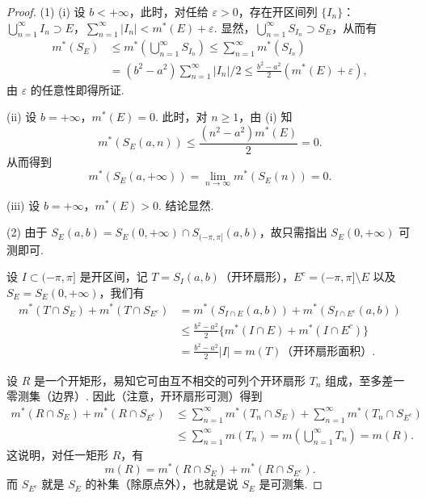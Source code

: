 \documentclass[../../main.tex]{subfiles}
\begin{document}
\begin{proof}
(1) (i) 设 \(b < +\infty\)，此时，对任给 \(\varepsilon > 0\)，存在开区间列 \(\{I_n\}\)：\(\bigcup_{n = 1}^{\infty} I_n \supset E\)，\(\sum_{n = 1}^{\infty}|I_n| < m^*(E) + \varepsilon\). 显然，\(\bigcup_{n = 1}^{\infty} S_{I_n} \supset S_E\)，从而有
\begin{align*}
m^*(S_E) &\leqslant m^*\left(\bigcup_{n = 1}^{\infty} S_{I_n}\right) \leqslant \sum_{n = 1}^{\infty}m^*(S_{I_n})\\
&= (b^2 - a^2)\sum_{n = 1}^{\infty}|I_n|/2 \leqslant \frac{b^2 - a^2}{2}(m^*(E) + \varepsilon),
\end{align*}
由 \(\varepsilon\) 的任意性即得所证.

(ii) 设 \(b = +\infty\)，\(m^*(E) = 0\). 此时，对 \(n \geqslant 1\)，由 (i) 知
\[
m^*(S_E(a,n)) \leqslant \frac{(n^2 - a^2)m^*(E)}{2} = 0.
\]
从而得到
\[
m^*(S_E(a, +\infty)) = \lim_{n \to \infty}m^*(S_E(n)) = 0.
\]

(iii) 设 \(b = +\infty\)，\(m^*(E) > 0\). 结论显然.

(2) 由于 \(S_E(a,b) = S_E(0, +\infty) \cap S_{(-\pi, \pi]}(a,b)\)，故只需指出 \(S_E(0, +\infty)\) 可测即可.

设 \(I \subset (-\pi, \pi]\) 是开区间，记 \(T = S_I(a,b)\)（开环扇形），\(E^c = (-\pi, \pi] \setminus E\) 以及 \(S_E = S_E(0, +\infty)\)，我们有
\begin{align*}
m^*(T \cap S_E) + m^*(T \cap S_{E^c}) 
&= m^*(S_{I \cap E}(a,b)) + m^*(S_{I \cap E^c}(a,b))\\
&\leqslant \frac{b^2 - a^2}{2}\{m^*(I \cap E) + m^*(I \cap E^c)\}\\
&= \frac{b^2 - a^2}{2}|I| = m(T) \text{（开环扇形面积）}.
\end{align*}

设 \(R\) 是一个开矩形，易知它可由互不相交的可列个开环扇形 \(T_n\) 组成，至多差一零测集（边界）. 因此（注意，开环扇形可测）得到
\begin{align*}
m^*(R \cap S_E) + m^*(R \cap S_{E^c}) 
&\leqslant \sum_{n = 1}^{\infty}m^*(T_n \cap S_E) + \sum_{n = 1}^{\infty}m^*(T_n \cap S_{E^c})\\
&\leqslant \sum_{n = 1}^{\infty}m(T_n) = m\left(\bigcup_{n = 1}^{\infty} T_n\right) = m(R).
\end{align*}
这说明，对任一矩形 \(R\)，有
\[
m(R) = m^*(R \cap S_E) + m^*(R \cap S_{E^c}).
\]
而 \(S_{E^c}\) 就是 \(S_E\) 的补集（除原点外），也就是说 \(S_E\) 是可测集. 
\end{proof}
\end{document}
